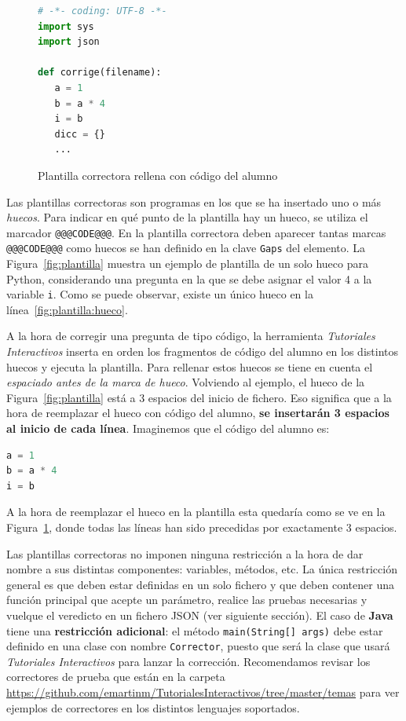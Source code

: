 \documentclass[]{article}
\newcommand{\code}[1]{{\lstinline[basicstyle=\ttfamily,mathescape]!#1!}}
\newcommand{\toolname}{\emph{Tutoriales Interactivos}}
\begin{document}
\begin{figure}[tb]
\begin{lstlisting}[language=Python,basicstyle=\ttfamily, otherkeywords={with}]
# -*- coding: UTF-8 -*-
import sys
import json
	
def corrige(filename):
   a = 1
   b = a * 4
   i = b
   dicc = {}
   ...
\end{lstlisting}	
\caption{Plantilla correctora rellena con código del alumno\label{fig:plantillaRellena}}
\end{figure}

Las plantillas correctoras son programas en los que se ha insertado uno o más \emph{huecos}. Para indicar en qué punto de la plantilla hay un hueco, se utiliza el marcador \code{@@@CODE@@@}. En la plantilla correctora deben aparecer tantas marcas \code{@@@CODE@@@} como huecos se han definido en la clave \code{Gaps} del elemento. La Figura~\ref{fig:plantilla} \todo{pone \code{@@@CODIGO@@@} y no \code{@@@CODE@@@}}muestra un ejemplo de plantilla de un solo hueco para Python, considerando una pregunta en la que se debe asignar el valor 4 a la variable \code{i}. Como se puede observar, existe un único hueco en la línea~\ref{fig:plantilla:hueco}.

A la hora de corregir una pregunta de tipo código, la herramienta \toolname{} inserta en orden los fragmentos de código del alumno en los distintos huecos y ejecuta la plantilla. Para rellenar estos huecos se tiene en cuenta el \emph{espaciado antes de la marca de hueco}. Volviendo al ejemplo, el hueco de la Figura~\ref{fig:plantilla} está a 3 espacios del inicio de fichero. Eso significa que a la hora de reemplazar el hueco con código del alumno, \textbf{se insertarán 3 espacios al inicio de cada línea}. Imaginemos que el código del alumno es:
\begin{lstlisting}[language=Python,basicstyle=\ttfamily, otherkeywords={with}]
a = 1
b = a * 4
i = b
\end{lstlisting}
A la hora de reemplazar el hueco en la plantilla esta quedaría como se ve en la Figura~\ref{fig:plantillaRellena}, donde todas las líneas han sido precedidas por exactamente 3 espacios.

Las plantillas correctoras no imponen ninguna restricción a la hora de dar nombre a sus distintas componentes: variables, métodos, etc. La única restricción general es que deben estar definidas en un solo fichero y que deben contener una función principal que acepte un parámetro, realice las pruebas necesarias y vuelque el veredicto en un fichero JSON (ver siguiente sección). El caso de \textbf{Java} tiene una \textbf{restricción adicional}: el método \code{main(String[] args)} debe estar definido en una clase con nombre \code{Corrector}, puesto que será la clase que usará \toolname{} para lanzar la corrección. Recomendamos revisar los correctores de prueba que están en la carpeta \url{https://github.com/emartinm/TutorialesInteractivos/tree/master/temas} para ver ejemplos de correctores en los distintos lenguajes soportados.
\end{document}
